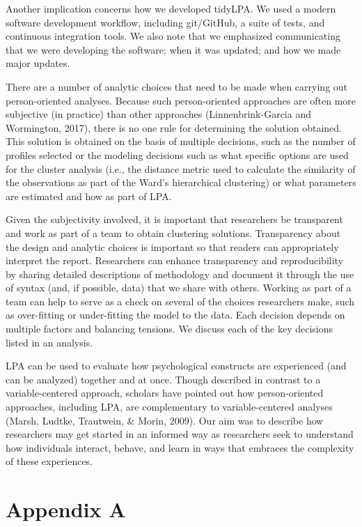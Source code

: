 \documentclass[english,man]{apa6}
\begin{document}
Another implication concerns how we developed tidyLPA. We used a modern software
development workflow, including git/GitHub, a suite of tests, and continuous
integration tools. We also note that we emphasized communicating that we were
developing the software; when it was updated; and how we made major updates.

There are a number of analytic choices that need to be made when carrying out
person-oriented analyses. Because such person-oriented approaches are often more
subjective (in practice) than other approaches (Linnenbrink-Garcia and
Wormington, 2017), there is no one rule for determining the solution obtained.
This solution is obtained on the basis of multiple decisions, such as the number
of profiles selected or the modeling decisions such as what specific options are
used for the cluster analysis (i.e., the distance metric used to calculate the
similarity of the observations as part of the Ward's hierarchical clustering) or
what parameters are estimated and how as part of LPA.

Given the subjectivity involved, it is important that researchers be transparent
and work as part of a team to obtain clustering solutions. Transparency about
the design and analytic choices is important so that readers can appropriately
interpret the report. Researchers can enhance transparency and reproducibility
by sharing detailed descriptions of methodology and document it through the use
of syntax (and, if possible, data) that we share with others. Working as part of
a team can help to serve as a check on several of the choices researchers make,
such as over-fitting or under-fitting the model to the data. Each decision
depends on multiple factors and balancing tensions. We discuss each of the key
decisions listed in an analysis.

LPA can be used to evaluate how psychological constructs are experienced (and
can be analyzed) together and at once. Though described in contrast to a
variable-centered approach, scholars have pointed out how person-oriented
approaches, including LPA, are complementary to variable-centered analyses
(Marsh, Ludtke, Trautwein, \& Morin, 2009). Our aim was to describe how
researchers may get started in an informed way as researchers seek to understand
how individuals interact, behave, and learn in ways that embraces the complexity
of these experiences.

\hypertarget{appendix-a}{%
\section{Appendix A}\label{appendix-a}}
\end{document}
